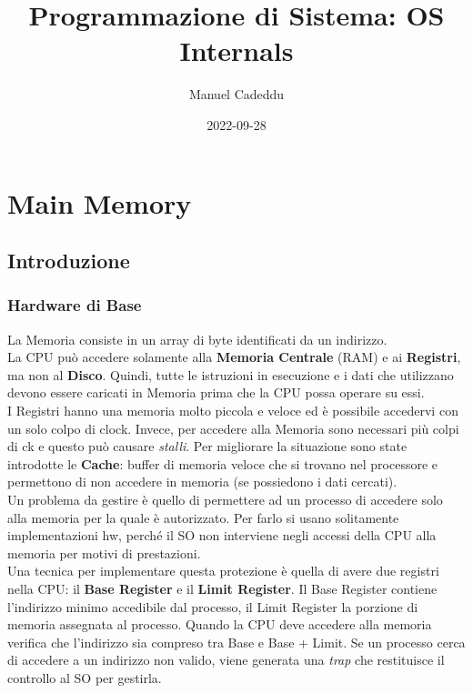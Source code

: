 \documentclass{article}
\title{Programmazione di Sistema: OS Internals}
\date{2022-09-28}
\author{Manuel Cadeddu}
\begin{document}
	\maketitle
	\newpage
	\doublespacing
	\tableofcontents
	\singlespacing
	\newpage
	
	\section{Main Memory}

		\subsection{Introduzione}

			\subsubsection{Hardware di Base}
				La Memoria consiste in un array di byte identificati da un indirizzo.
				\\La CPU può accedere solamente alla \textbf{Memoria Centrale} (RAM) e ai \textbf{Registri}, ma non al \textbf{Disco}. Quindi, tutte le istruzioni in esecuzione e i dati che utilizzano devono essere caricati in Memoria prima che la CPU possa operare su essi.
				\\I Registri hanno una memoria molto piccola e veloce ed è possibile accedervi con un solo colpo di clock. Invece, per accedere alla Memoria sono necessari più colpi di ck e questo può causare \textit{stalli}. Per migliorare la situazione sono state introdotte le \textbf{Cache}: buffer di memoria veloce che si trovano nel processore e permettono di non accedere in memoria (se possiedono i dati cercati).
				\\Un problema da gestire è quello di permettere ad un processo di accedere solo alla memoria per la quale è autorizzato. Per farlo si usano solitamente implementazioni hw, perché il SO non interviene negli accessi della CPU alla memoria per motivi di prestazioni.
				\\Una tecnica per implementare questa protezione è quella di avere due registri nella CPU: il \textbf{Base Register} e il \textbf{Limit Register}. Il Base Register contiene l'indirizzo minimo accedibile dal processo, il Limit Register la porzione di memoria assegnata al processo. Quando la CPU deve accedere alla memoria verifica che l'indirizzo sia compreso tra Base e Base + Limit. Se un processo cerca di accedere a un indirizzo non valido, viene generata una \textit{trap} che restituisce il controllo al SO per gestirla.
\end{document}
